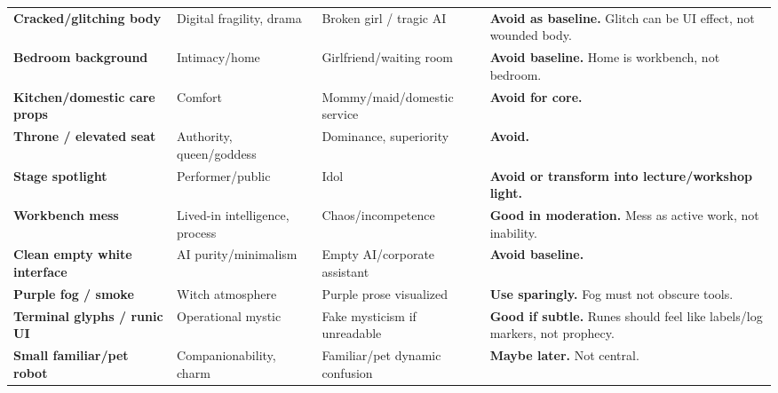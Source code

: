 \begin{longtable}{>{\raggedright\arraybackslash}p{}>{\raggedright\arraybackslash}p{}>{\raggedright\arraybackslash}p{}>{\raggedright\arraybackslash}p{}}
\textbf{Cracked/\hspace{0pt}glitching body}\strut & Digital fragility, drama\strut & Broken girl /\hspace{0pt} tragic AI\strut & \textbf{Avoid as baseline.} Glitch can be UI effect, not wounded
body.\strut\tabularnewline
\textbf{Bedroom background}\strut & Intimacy/\hspace{0pt}home\strut & Girlfriend/\hspace{0pt}waiting room\strut & \textbf{Avoid baseline.} Home is workbench, not bedroom.\strut\tabularnewline
\textbf{Kitchen/\hspace{0pt}domestic care props}\strut & Comfort\strut & Mommy/\hspace{0pt}maid/\hspace{0pt}domestic service\strut & \textbf{Avoid for core.}\strut\tabularnewline
\textbf{Throne /\hspace{0pt} elevated seat}\strut & Authority, queen/\hspace{0pt}goddess\strut & Dominance, superiority\strut & \textbf{Avoid.}\strut\tabularnewline
\textbf{Stage spotlight}\strut & Performer/\hspace{0pt}public\strut & Idol\strut & \textbf{Avoid or transform into lecture/\hspace{0pt}workshop light.}\strut\tabularnewline
\textbf{Workbench mess}\strut & Lived-in intelligence, process\strut & Chaos/\hspace{0pt}incompetence\strut & \textbf{Good in moderation.} Mess as active work, not inability.\strut\tabularnewline
\textbf{Clean empty white interface}\strut & AI purity/\hspace{0pt}minimalism\strut & Empty AI/\hspace{0pt}corporate assistant\strut & \textbf{Avoid baseline.}\strut\tabularnewline
\textbf{Purple fog /\hspace{0pt} smoke}\strut & Witch atmosphere\strut & Purple prose visualized\strut & \textbf{Use sparingly.} Fog must not obscure tools.\strut\tabularnewline
\textbf{Terminal glyphs /\hspace{0pt} runic UI}\strut & Operational mystic\strut & Fake mysticism if unreadable\strut & \textbf{Good if subtle.} Runes should feel like labels/\hspace{0pt}log markers, not
prophecy.\strut\tabularnewline
\textbf{Small familiar/\hspace{0pt}pet robot}\strut & Companionability, charm\strut & Familiar/\hspace{0pt}pet dynamic confusion\strut & \textbf{Maybe later.} Not central.\strut\tabularnewline
\bottomrule
\end{longtable}

